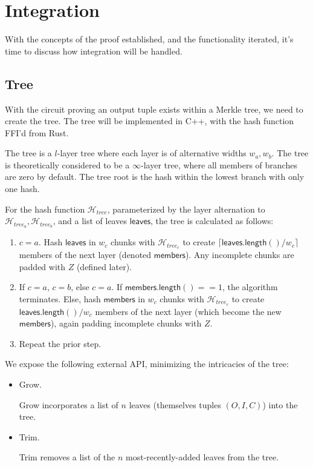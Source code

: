 \documentclass[]{article}
\begin{document}
\section{Integration}

With the concepts of the proof established, and the functionality iterated, it's time to discuss how integration will be handled.

\subsection{Tree}

With the circuit proving an output tuple exists within a Merkle tree, we need to create the tree. The tree will be implemented in C++, with the hash function FFI'd from Rust.

The tree is a $l$-layer tree where each layer is of alternative widths $w_a, w_b$. The tree is theoretically considered to be a $\infty$-layer tree, where all members of branches are zero by default. The tree root is the hash within the lowest branch with only one hash.

For the hash function $\mathcal{H}_{tree}$, parameterized by the layer alternation to $\mathcal{H}_{tree_a}, \mathcal{H}_{tree_b}$, and a list of leaves $\mathsf{leaves}$, the tree is calculated as follows:

\begin{enumerate}
	\item $c = a$. Hash $\mathsf{leaves}$ in $w_c$ chunks with $\mathcal{H}_{tree_c}$ to create $\lceil \mathsf{leaves.length()} / w_c \rceil$ members of the next layer (denoted $\mathsf{members}$). Any incomplete chunks are padded with $Z$ (defined later).
	\item If $c = a$, $c = b$, else $c = a$. If $\mathsf{members.length()} == 1$, the algorithm terminates. Else, hash $\mathsf{members}$ in $w_c$ chunks with $\mathcal{H}_{tree_c}$ to create $\mathsf{leaves.length()} / w_c$ members of the next layer (which become the new $\mathsf{members}$), again padding incomplete chunks with $Z$.
	\item Repeat the prior step.
\end{enumerate}

We expose the following external API, minimizing the intricacies of the tree:

\begin{itemize}
  \item Grow.
  
  Grow incorporates a list of $n$ leaves (themselves tuples $(O, I, C)$) into the tree.
  \item Trim.

  Trim removes a list of the $n$ most-recently-added leaves from the tree.
\end{itemize}
\end{document}
